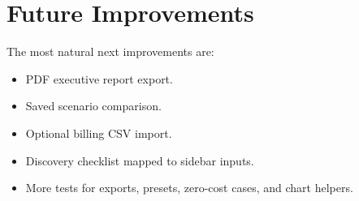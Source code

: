 \documentclass[11pt,a4paper]{article}
\begin{document}
\section{Future Improvements}

The most natural next improvements are:

\begin{itemize}
  \item PDF executive report export.
  \item Saved scenario comparison.
  \item Optional billing CSV import.
  \item Discovery checklist mapped to sidebar inputs.
  \item More tests for exports, presets, zero-cost cases, and chart helpers.
\end{itemize}
\end{document}
